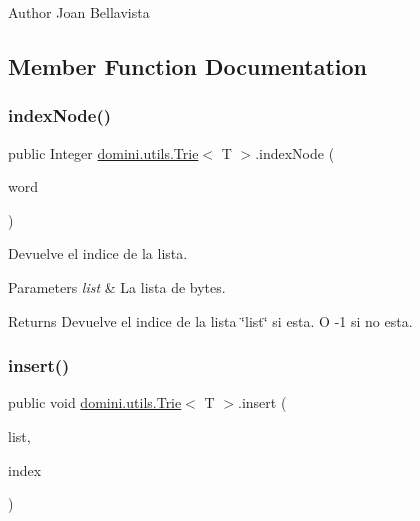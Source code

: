 \begin{DoxyAuthor}{Author}
Joan Bellavista 
\end{DoxyAuthor}


\subsection{Member Function Documentation}
\mbox{\label{classdomini_1_1utils_1_1Trie_a5c30e36df9ab804bbc054805358ecf2a}} 
\subsubsection{\texorpdfstring{index\+Node()}{indexNode()}}
{\footnotesize\ttfamily public Integer \hyperlink{classdomini_1_1utils_1_1Trie}{domini.\+utils.\+Trie}$<$ T $>$.index\+Node (\begin{DoxyParamCaption}\item[{Array\+List$<$ T $>$}]{word }\end{DoxyParamCaption})\hspace{0.3cm}{\ttfamily [inline]}}



Devuelve el indice de la lista. 


\begin{DoxyParams}{Parameters}
{\em list} & La lista de bytes. \\
\hline
\end{DoxyParams}
\begin{DoxyReturn}{Returns}
Devuelve el indice de la lista \char`\"{}list\char`\"{} si esta. O -\/1 si no esta. 
\end{DoxyReturn}
\mbox{\label{classdomini_1_1utils_1_1Trie_a3599001d9b056f0b54ab7eabb9d3510b}} 
\subsubsection{\texorpdfstring{insert()}{insert()}}
{\footnotesize\ttfamily public void \hyperlink{classdomini_1_1utils_1_1Trie}{domini.\+utils.\+Trie}$<$ T $>$.insert (\begin{DoxyParamCaption}\item[{Array\+List$<$ T $>$}]{list,  }\item[{Integer}]{index }\end{DoxyParamCaption})\hspace{0.3cm}{\ttfamily [inline]}}




